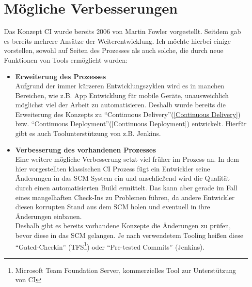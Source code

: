 \section{Mögliche Verbesserungen}
Das Konzept CI wurde bereits 2006 von Martin Fowler vorgestellt. Seitdem gab es bereits mehrere Ansätze der Weiterentwicklung. Ich möchte hierbei einige vorstellen, sowohl auf Seiten des Prozesses als auch solche, die durch neue Funktionen von Tools ermöglicht wurden:
\begin{itemize}
	\item \textbf{Erweiterung des Prozesses}\\
 Aufgrund der immer kürzeren Entwicklungszyklen wird es in manchen Bereichen, wie z.B. App Entwicklung für mobile Geräte, unausweichlich möglichst viel der Arbeit zu automatisieren. Deshalb wurde bereits die Erweiterung des Konzepts zu "`Continuous Delivery"'(\autoref{Continuous Delivery}) bzw. "`Continuous Deployment"'(\autoref{Continuous Deployment}) entwickelt. Hierfür gibt es auch Toolunterstützung von z.B. Jenkins.
	\item \textbf{Verbesserung des vorhandenen Prozesses}\\
Eine weitere mögliche Verbesserung setzt viel früher im Prozess an. In dem hier vorgestellten klassischen CI Prozess fügt ein Entwickler seine Änderungen in das SCM System ein und anschließend wird die Qualität durch einen automatisierten Build ermittelt. Das kann aber gerade im Fall eines mangelhaften Check-Ins zu Problemen führen, da andere Entwickler diesen korrupten Stand aus dem SCM holen und eventuell in ihre Änderungen einbauen.\\
Deshalb gibt es bereits vorhandene Konzepte die Änderungen zu prüfen, bevor diese in das SCM gelangen. Je nach verwendetem Tooling heißen diese "`Gated-Checkin"'\cite{TFS-GC} (TFS\footnote{Microsoft Team Foundation Server, kommerzielles Tool zur Unterstützung von CI}) oder "`Pre-tested Commits"'\cite{Jenkins-GC} (Jenkins).

\end{itemize} 